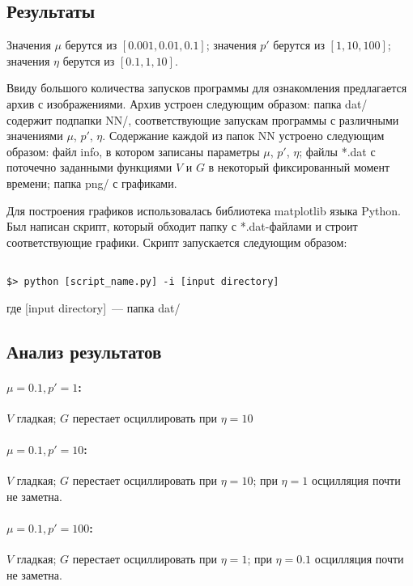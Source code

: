 \documentclass[12pt]{article}
\begin{document}
\subsection{Результаты}


Значения $\mu$ берутся из $[0.001, 0.01, 0.1]$; значения $p'$ берутся из $[1, 10, 100]$; значения $\eta$ берутся из $[0.1, 1, 10]$.

Ввиду большого количества запусков программы для ознакомления предлагается архив с изображениями. Архив устроен следующим образом: папка dat/ содержит подпапки NN/, соответствующие запускам программы с различными значениями $\mu$, $p'$, $\eta$. Содержание каждой из папок NN устроено следующим образом: файл info, в котором записаны параметры $\mu$, $p'$, $\eta$; файлы *.dat с поточечно заданными функциями $V$ и $G$ в некоторый фиксированный момент времени; папка png/ с графиками.

Для построения графиков использовалась библиотека matplotlib языка Python. Был написан скрипт, который обходит папку с *.dat-файлами и строит соответствующие графики. Скрипт запускается следующим образом:

\lstset{language=bash}
\begin{lstlisting}[frame=single]  % Start your code-block

$> python [script_name.py] -i [input directory]

\end{lstlisting}

где [input directory]~--- папка dat/

\subsection{Анализ результатов}
\paragraph{$\mu = 0.1, p' = 1$:}
$V$ гладкая; $G$ перестает осциллировать при $\eta = 10$
\paragraph{$\mu = 0.1, p' = 10$:}
$V$ гладкая; $G$ перестает осциллировать при $\eta = 10$; при $\eta = 1$ осцилляция почти не заметна.
\paragraph{$\mu = 0.1, p' = 100$:}
$V$ гладкая; $G$ перестает осциллировать при $\eta = 1$; при $\eta = 0.1$ осцилляция почти не заметна.
\end{document}
